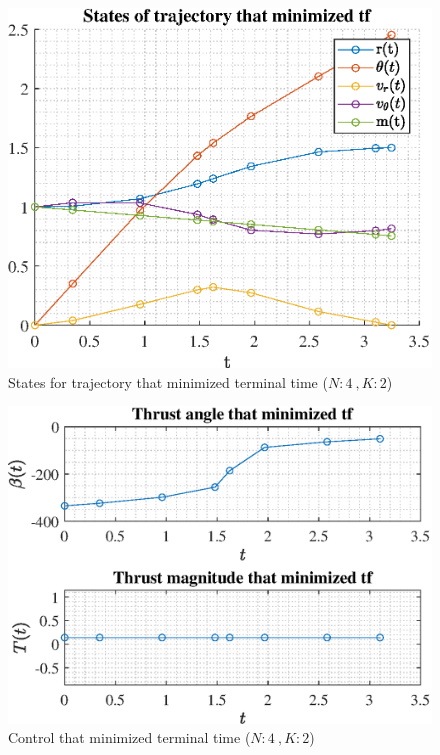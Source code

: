 \documentclass[]{article}
\begin{document}
	\begin{figure}
		\centering
		\includegraphics[scale=0.75]{states_N4_K2_C2_tf.eps}
		\caption{States for trajectory that minimized terminal time (\(N:4\ , K:2\))}
		\label{fig:states_N4_K2_C2_tf}
	\end{figure}
	\begin{figure}
		\centering
		\includegraphics[scale=0.75]{control_N4_K2_C2_tf.eps}
		\caption{Control that minimized terminal time (\(N:4\ , K:2\))}
		\label{fig:control_N4_K2_C2_tf}
	\end{figure}
\end{document}
